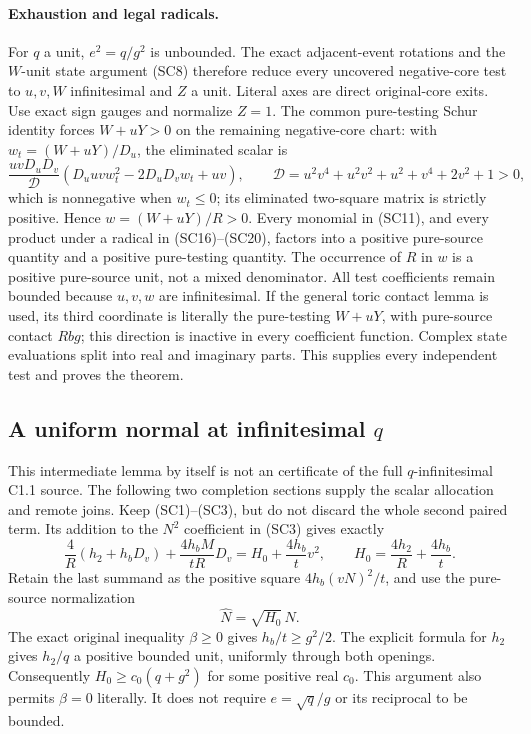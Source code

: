\paragraph{Exhaustion and legal radicals.}
For $q$ a unit, $e^2=q/g^2$ is unbounded. The exact adjacent-event
rotations and the $W$-unit state argument (SC8) therefore reduce every
uncovered negative-core test to $u,v,W$ infinitesimal and $Z$ a unit.
Literal axes are direct original-core exits. Use exact sign gauges and
normalize $Z=1$. The common pure-testing Schur identity forces
$W+uY>0$ on the remaining negative-core chart: with
$w_t=(W+uY)/D_u$, the eliminated scalar is
\[
 \frac{uvD_uD_v}{\mathcal D}
       (D_uuv w_t^2-2D_uD_vw_t+uv),\qquad
 \mathcal D=u^2v^4+u^2v^2+u^2+v^4+2v^2+1>0,
\]
which is nonnegative when $w_t\le0$; its eliminated two-square
matrix is strictly positive. Hence $w=(W+uY)/R>0$.
Every monomial in (SC11), and every product under a radical in
(SC16)--(SC20), factors into a positive pure-source quantity and a
positive pure-testing quantity. The occurrence of $R$ in $w$ is a
positive pure-source unit, not a mixed denominator. All test
coefficients remain bounded because $u,v,w$ are infinitesimal.
If the general toric contact lemma is used, its third coordinate
is literally the pure-testing $W+uY$, with pure-source contact
$Rbg$; this direction is inactive in every coefficient function.
Complex state evaluations split into real and imaginary parts.
This supplies every independent test and proves the theorem.



\subsection{A uniform normal at infinitesimal $q$}

\label{component:p7d43f3fccb7d}

This intermediate lemma by itself is not an certificate of the full
$q$-infinitesimal C1.1 source. The following two completion sections
supply the scalar allocation and remote joins. Keep (SC1)--(SC3), but do
not discard the whole second paired term. Its addition to the
$N^2$ coefficient in (SC3) gives exactly
\[
 \frac4R(h_2+h_bD_v)+\frac{4h_bM}{tR}D_v
       =H_0+\frac{4h_b}{t}v^2,
 \qquad H_0=\frac{4h_2}{R}+\frac{4h_b}{t}.
\]
Retain the last summand as the positive square
$4h_b(vN)^2/t$, and use the pure-source normalization
\[
                         \widehat N=\sqrt{H_0}\,N.
\]
The exact original inequality $\beta\ge0$ gives
$h_b/t\ge g^2/2$. The explicit formula for $h_2$ gives
$h_2/q$ a positive bounded unit, uniformly through both openings.
Consequently $H_0\ge c_0(q+g^2)$ for some positive real $c_0$.
This argument also permits $\beta=0$ literally. It does not require
$e=\sqrt q/g$ or its reciprocal to be bounded.


